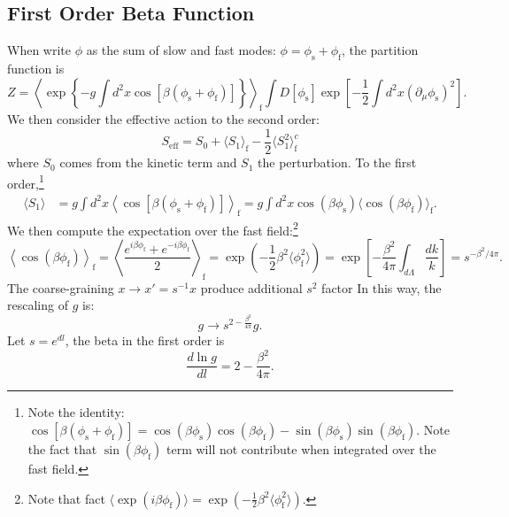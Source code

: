 \documentclass[aps,prb,superscriptaddress,nofootinbib]{revtex4}
\begin{document}
\subsection{First Order Beta Function}
When write $\phi$ as the sum of slow and fast modes: $\phi=\phi_{\mathrm{s}}+\phi_{\mathrm{f}}$, the partition function is
\begin{equation}
	Z = \left\langle\exp\left\{-g \int d^2 x \cos\left[\beta(\phi_{\mathrm{s}}+\phi_{\mathrm{f}})\right] \right\}\right\rangle_{\mathrm{f}} \int D[\phi_{\mathrm{s}}] \exp\left[-\frac{1}{2}\int d^2x (\partial_\mu\phi_{\mathrm{s}})^2\right].
\end{equation}
We then consider the effective action to the second order:
\begin{equation}
	S_{\mathrm{eff}} = S_0 + \langle S_1\rangle_{\mathrm{f}} - \frac{1}{2}\langle S_1^2\rangle_{\mathrm{f}}^c
\end{equation}
where $S_0$ comes from the kinetic term and $S_1$ the perturbation.
To the first order,\footnote{Note the identity: $\cos\left[\beta(\phi_{\mathrm{s}}+\phi_{\mathrm{f}})\right]=\cos(\beta\phi_{\mathrm{s}})\cos(\beta\phi_{\mathrm{f}})-\sin(\beta\phi_{\mathrm{s}})\sin(\beta\phi_{\mathrm{f}})$. Note the fact that $\sin(\beta\phi_{\mathrm{f}})$ term will not contribute when integrated over the fast field.}
\begin{equation}
\begin{aligned}
	\langle S_1\rangle &= g \int d^2 x \left\langle\cos\left[\beta(\phi_{\mathrm{s}}+\phi_{\mathrm{f}})\right] \right\rangle_{\mathrm{f}} 
	= g \int d^2 x \cos(\beta\phi_{\mathrm{s}})\langle\cos(\beta\phi_{\mathrm{f}})\rangle_{\mathrm{f}}.
\end{aligned}
\end{equation}
We then compute the expectation over the fast field:\footnote{Note that fact $\langle \exp(i\beta\phi_{\mathrm{f}})\rangle = \exp(-\frac{1}{2}\beta^2 \langle\phi_{\mathrm{f}}^2\rangle)$.}
\begin{equation}
	\left\langle \cos(\beta\phi_{\mathrm{f}})\right\rangle_{\mathrm{f}}
	= \left\langle \frac{e^{i\beta\phi_{\mathrm{f}}} + e^{-i\beta\phi_{\mathrm{f}}}}{2}\right\rangle_{\mathrm{f}}
	= \exp\left({-\frac{1}{2}\beta^2\langle\phi_{\mathrm{f}}^2\rangle}\right) 
	= \exp\left[-\frac{\beta^2}{4\pi}\int_{d\Lambda}\frac{dk}{k} \right] 
	= s^{-\beta^2/4\pi}.
\end{equation}
The coarse-graining $x\rightarrow x'=s^{-1}x$ produce additional $s^{2}$ factor
In this way, the rescaling of $g$ is:
\begin{equation}
	g \rightarrow s^{2-\frac{\beta^2}{4\pi}} g.
\end{equation}
Let $s=e^{dl}$, the beta in the first order is
\begin{equation}
	\frac{d \ln g}{dl} = 2-\frac{\beta^2}{4\pi}.
\end{equation}
\end{document}
